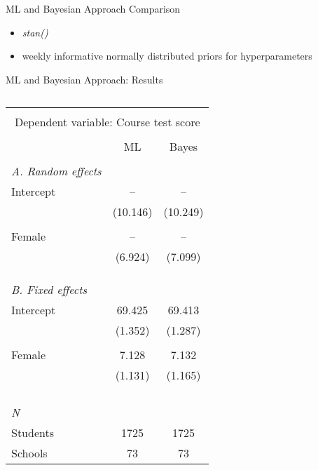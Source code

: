 \begin{frame}{ML and Bayesian Approach Comparison}
	\Large{
		\begin{itemize}
			\item[]  \textit{stan()}
			\item[]  weekly informative normally distributed priors for hyperparameters
			
		\end{itemize}		
	}
\end{frame}

\begin{frame}{ML and Bayesian Approach: Results}
	\Large{
			\begin{columns}
								
				\begin{column}{0.7\textwidth}
					\begin{table}
						\footnotesize
						\begin{tabular}{l*{2}{c}}
							\toprule \\[-1.0em]
							\multicolumn{3}{c}{Dependent variable: Course test score}\\ \\[-1.0em]
							&ML &Bayes\\ \midrule \\[-1.0em]
							\emph{A. Random effects} \\
							Intercept & -- & --\\
							& (10.146) & (10.249)\\ \\[-1.0em]
							Female & -- & --\\
							& (6.924) & (7.099)\\ \\[-1.0em]
							\\ \\[-1.0em]\emph{B. Fixed effects} \\
							Intercept & 69.425 & 69.413\\
							& (1.352) & (1.287)\\ \\[-1.0em]
							Female & 7.128 & 7.132\\
							& (1.131) & (1.165)\\ \\[-1.0em]
							\\ \\[-1.0em]\hline \\[-1.0em]
							\emph{N} \\
							\hspace{3mm}Students&1725&1725\\
							\hspace{3mm}Schools&73&73\\
							\bottomrule
						\end{tabular}
					\end{table}    
				\end{column}
			

\end{columns}}
\end{frame}
